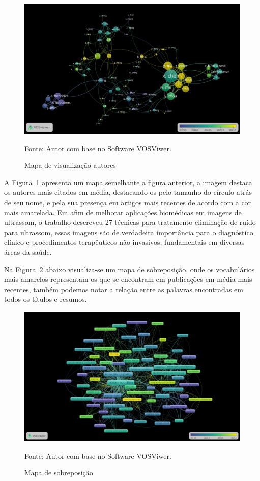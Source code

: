 \begin{figure}[H]
	\centering
	\includegraphics[width=15cm]{anexos/ris/IEEE/Noise_reduction_and_noise_abatement_andsensor_filtering_algorithm/overlay_visualization_cites.png}
	\caption{Mapa de visualização autores}
	Fonte: Autor com base no Software VOSViwer.
	\label{fig: overlay_visualization_cites}
\end{figure}

A Figura~\ref{fig: overlay_visualization_cites} apresenta um mapa semelhante a figura anterior, a imagem destaca os autores mais citados em média, destacando-os pelo tamanho do círculo atrás de seu nome, e pela sua presença em artigos mais recentes de acordo com a cor mais amarelada.
Em \cite{duarte_speckle_noise} afim de melhorar aplicações biomédicas em imagens de ultrassom, o trabalho descreveu 27 técnicas para tratamento eliminação de ruído para ultrassom, essas imagens são de verdadeira importância para o diagnóstico clínico e procedimentos terapêuticos não invasivos, fundamentais em diversas áreas da saúde.

Na Figura~\ref{fig: overlay_visualization} abaixo visualiza-se um mapa de sobreposição, onde os vocabulários mais amarelos representam os que se encontram em publicações em média mais recentes, também podemos notar a relação entre as palavras encontradas em todos os títulos e resumos.

\begin{figure}[H]
	\centering
	\includegraphics[width=15cm]{anexos/ris/IEEE/Noise_reduction_and_noise_abatement_andsensor_filtering_algorithm/overlay_visualization.png}
	\caption{Mapa de sobreposição}
	Fonte: Autor com base no Software VOSViwer.
	\label{fig: overlay_visualization}
\end{figure}

